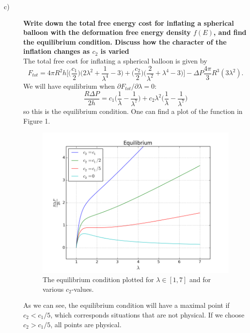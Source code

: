 \documentclass[norsk,a4paper,12pt]{article}
\begin{document}
\begin{description}
\item [c)] \textbf{Write down the total free energy cost for inflating a spherical balloon with the deformation free energy density $f(E)$, and find the equilibrium condition. Discuss how the character of the inflation changes as $c_2$ is varied}\\
The total free cost for inflating a spherical balloon is given by
\begin{equation*}
F_{tot}=4\pi R^2h\Bigg[\bigg(\frac{c_1}{2}\bigg)\bigg(2\lambda^2+\frac{1}{\lambda^4}-3\bigg)+\bigg(\frac{c_2}{2}\bigg)\bigg(\frac{2}{\lambda^2}+\lambda^4-3\bigg)\Bigg]-\Delta P\frac{4\pi}{3}R^3(3\lambda^2).
\end{equation*}
We will have equilibrium when $\partial F_{tot}/\partial\lambda=0$:
\begin{equation}
\frac{R\Delta P}{2h}=c_1\bigg(\frac{1}{\lambda}-\frac{1}{\lambda^7}\bigg)+c_2\lambda^2\bigg(\frac{1}{\lambda}-\frac{1}{\lambda^7}\bigg)
\end{equation}
so this is the equilibrium condition. One can find a plot of the function in Figure 1.
\begin{figure}[H]
\centering
\includegraphics[width=150mm]{figure_2.png}
\caption{The equilibrium condition plotted for $\lambda\in[1,7]$ and for various $c_2$-values.}
\end{figure}
As we can see, the equilibrium condition will have a maximal point if $c_2<c_1/5$, which corresponds situations that are not physical. If we choose $c_2>c_1/5$, all points are physical.
\end{description}
\end{document}
